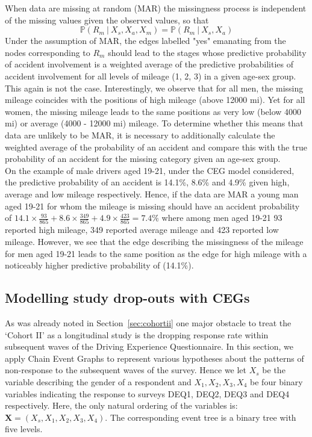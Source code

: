 \documentclass[runningheads]{llncs}
\begin{document}
When data are missing at random (MAR) the missingness process is independent of the missing values given the observed values, so that 
\[\mathbb{P}(R_m \ | \ X_s, X_a, X_m) =  \mathbb{P}(R_m \ | \ X_s, X_a)\]
Under the assumption of MAR, the edges labelled "yes" emanating from the nodes corresponding to $R_m$ should lead to the stages whose predictive probability of accident involvement is a weighted average of the predictive probabilities of accident involvement for all levels of mileage (1, 2, 3) in a given age-sex group. 
This again is not the case. Interestingly, we observe that for all men, the missing mileage coincides with the positions of high mileage (above 12000 mi). Yet for all women, the missing mileage leads to the same positions as very low (below 4000 mi) or average (4000 - 12000 mi) mileage. To determine whether this means that data are unlikely to be MAR, it is necessary to additionally calculate the weighted average of the probability of an accident and compare this with the true probability of an accident for the missing category given an age-sex group. \\
On the example of male drivers aged 19-21, under the CEG model considered, the predictive probability of an accident is 14.1\%, 8.6\% and 4.9\% given high, average and low mileage respectively. Hence, if the data are MAR a young man aged 19-21 for whom the mileage is missing should have an accident probability of $14.1 \times \frac{93}{865} + 8.6 \times \frac{349}{865} + 4.9 \times \frac{423}{865} = 7.4\%$ where among men aged 19-21 93 reported high mileage, 349 reported average mileage and 423 reported low mileage. However, we see that the edge describing the missingness of the mileage for men aged 19-21 leads to the same position as the edge for high mileage with a noticeably higher predictive probability of (14.1\%). 

\subsection{Modelling study drop-outs with CEGs}\label{subsec:dropouts}
As was already noted in Section~\ref{sec:cohortii} one major obstacle to treat the `Cohort II' as a longitudinal study is the dropping response rate within subsequent waves of the Driving Experience Questionnaire.
In this section, we apply Chain Event Graphs to represent various hypotheses about the patterns of non-response to the subsequent waves of the survey. Hence we let $X_s$ be the variable describing the gender of a respondent and $X_1, X_2, X_3, X_4$ be four binary variables indicating the response to surveys DEQ1, DEQ2, DEQ3 and DEQ4 respectively. Here, the only natural ordering of the variables is: $\boldsymbol{X} = (X_s, X_1, X_2, X_3, X_4)$. The corresponding event tree is a binary tree with five levels.
\end{document}
